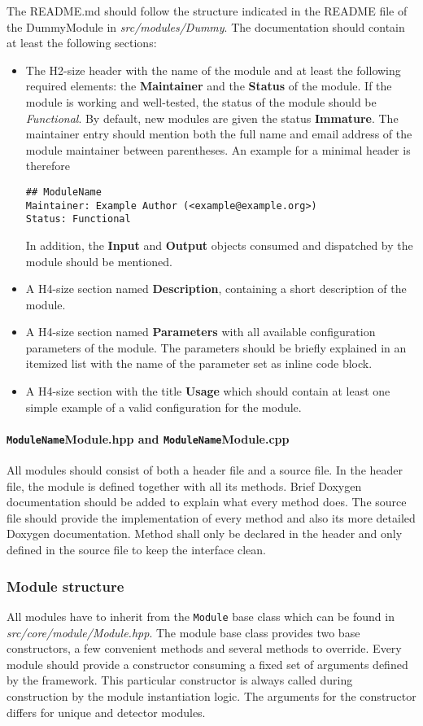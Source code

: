 The README.md should follow the structure indicated in the README file of the DummyModule in \textit{src/modules/Dummy}.
The documentation should contain at least the following sections:
\begin{itemize}
\item The H2-size header with the name of the module and at least the following required elements: the \textbf{Maintainer} and the \textbf{Status} of the module.
If the module is working and well-tested, the status of the module should be \textit{Functional}.
By default, new modules are given the status \textbf{Immature}.
The maintainer entry should mention both the full name and email address of the module maintainer between parentheses.
An example for a minimal header is therefore
\begin{verbatim}
## ModuleName
Maintainer: Example Author (<example@example.org>)
Status: Functional
\end{verbatim}
In addition, the \textbf{Input} and \textbf{Output} objects consumed and dispatched by the module should be mentioned.
\item A H4-size section named \textbf{Description}, containing a short description of the module.
\item A H4-size section named \textbf{Parameters} with all available configuration parameters of the module.
The parameters should be briefly explained in an itemized list with the name of the parameter set as inline code block.
\item A H4-size section with the title \textbf{Usage} which should contain at least one simple example of a valid configuration for the module.
\end{itemize}

\paragraph{\texttt{ModuleName}Module.hpp and \texttt{ModuleName}Module.cpp}
All modules should consist of both a header file and a source file.
In the header file, the module is defined together with all its methods.
Brief Doxygen documentation should be added to explain what every method does.
The source file should provide the implementation of every method and also its more detailed Doxygen documentation.
Method shall only be declared in the header and only defined in the source file to keep the interface clean.

\subsubsection{Module structure}
\label{sec:module_structure}
All modules have to inherit from the \texttt{Module} base class which can be found in \textit{src/core/module/Module.hpp}.
The module base class provides two base constructors, a few convenient methods and several methods to override.
Every module should provide a constructor consuming a fixed set of arguments defined by the framework.
This particular constructor is always called during construction by the module instantiation logic.
The arguments for the constructor differs for unique and detector modules.

